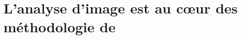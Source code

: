 \documentclass[\main/main.tex]{subfiles}
\begin{document}
\chapter{L'analyse d'image est au cœur des méthodologie de \hcs{}}






\end{document}
